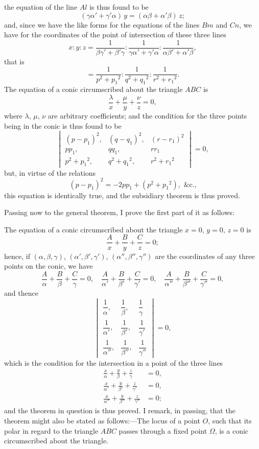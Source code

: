 \documentclass[11pt,a4paper]{article}
\begin{document}
the equation of the line $Al$ is thus found to be
\[
(\gamma\alpha' + \gamma'\alpha)\,y = (\alpha\beta + \alpha'\beta)\,z;
\]
and, since we have the like forms for the equations of the lines $Bm$ and $Cn$, we have
for the coordinates of the point of intersection of these three lines
\[
x : y : z = \frac{1}{\beta\gamma' + \beta'\gamma} : \frac{1}{\gamma\alpha' + \gamma'\alpha} : \frac{1}{\alpha\beta' + \alpha'\beta},
\]
that is
\[
= \frac{1}{p^2 + p_1{}^2} : \frac{1}{q^2 + q_1{}^2} : \frac{1}{r^2 + r_1{}^2}.
\]
The equation of a conic circumscribed about the triangle $ABC$ is
\[
\frac{\lambda}{x} + \frac{\mu}{y} + \frac{\nu}{z} = 0,
\]
where $\lambda$, $\mu$, $\nu$ are arbitrary coefficients; and the condition for the three points being
in the conic is thus found to be
\[
\begin{vmatrix}
(p-p_1)^2, & (q-q_1)^2, & (r-r_1)^2 \\
pp_1, & qq_1, & rr_1 \\
p^2+p_1{}^2, & q^2+q_1{}^2, & r^2+r_1{}^2
\end{vmatrix} = 0,
\]
but, in virtue of the relations
\[
(p-p_1)^2 = -2pp_1 + (p^2 + p_1{}^2), \text{ \&c.,}
\]
this equation is identically true, and the subsidiary theorem is thus proved.

Passing now to the general theorem, I prove the first part of it as follows:

The equation of a conic circumscribed about the triangle $x=0$, $y=0$, $z=0$ is
\[
\frac{A}{x} + \frac{B}{y} + \frac{C}{z} = 0;
\]
hence, if $(\alpha, \beta, \gamma)$, $(\alpha', \beta', \gamma')$, $(\alpha'', \beta'', \gamma'')$ are the coordinates of any three points on
the conic, we have
\[
\frac{A}{\alpha} + \frac{B}{\beta} + \frac{C}{\gamma} = 0, \quad
\frac{A}{\alpha'} + \frac{B}{\beta'} + \frac{C}{\gamma'} = 0, \quad
\frac{A}{\alpha''} + \frac{B}{\beta''} + \frac{C}{\gamma''} = 0,
\]
and thence
\[
\begin{vmatrix}
\dfrac{1}{\alpha}, & \dfrac{1}{\beta}, & \dfrac{1}{\gamma} \\[1ex]
\dfrac{1}{\alpha'}, & \dfrac{1}{\beta'}, & \dfrac{1}{\gamma'} \\[1ex]
\dfrac{1}{\alpha''}, & \dfrac{1}{\beta''}, & \dfrac{1}{\gamma''}
\end{vmatrix} = 0,
\]
which is the condition for the intersection in a point of the three lines
\begin{align*}
\frac{x}{\alpha} + \frac{y}{\beta} + \frac{z}{\gamma} &= 0,\\
\frac{x}{\alpha'} + \frac{y}{\beta'} + \frac{z}{\gamma'} &= 0,\\
\frac{x}{\alpha''} + \frac{y}{\beta''} + \frac{z}{\gamma''} &= 0;
\end{align*}
and the theorem in question is thus proved. I remark, in passing, that the theorem
might also be stated as follows:---The locus of a point $O$, such that its polar in
regard to the triangle $ABC$ passes through a fixed point $\Omega$, is a conic circumscribed
about the triangle.
\end{document}
